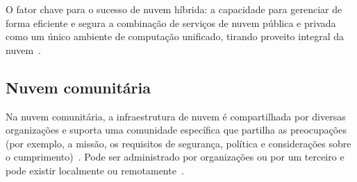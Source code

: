 O fator chave para o sucesso de nuvem híbrida: a capacidade para gerenciar de
forma eficiente e segura a combinação de serviços de nuvem pública e privada
como um único ambiente de computação unificado, tirando proveito integral da
nuvem~\cite{ibm-what-is-cloud-computing}.

\subsection{Nuvem comunitária} Na nuvem comunitária, a infraestrutura de nuvem é 
compartilhada por diversas organizações e suporta uma comunidade específica que 
partilha as preocupações (por exemplo, a missão, os requisitos de segurança, 
política e considerações sobre o cumprimento)~\cite{brown2014seguranca}. Pode ser 
administrado por organizações ou por um terceiro e pode existir localmente ou 
remotamente~\cite{brown2014seguranca}.
